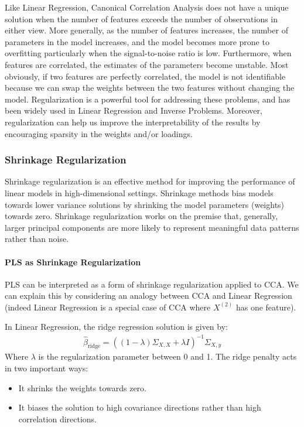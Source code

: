 Like Linear Regression, Canonical Correlation Analysis does not have a unique solution when the number of features exceeds the number of observations in either view.
More generally, as the number of features increases, the number of parameters in the model increases, and the model becomes more prone to overfitting particularly when the signal-to-noise ratio is low.
Furthermore, when features are correlated, the estimates of the parameters become unstable.
Most obviously, if two features are perfectly correlated, the model is not identifiable because we can swap the weights between the two features without changing the model.
Regularization is a powerful tool for addressing these problems, and has been widely used in Linear Regression and Inverse Problems.
Moreover, regularization can help us improve the interpretability of the results by encouraging sparsity in the weights and/or loadings.

\subsubsection{Shrinkage Regularization}

Shrinkage regularization is an effective method for improving the performance of linear models in high-dimensional settings.
Shrinkage methods bias models towards lower variance solutions by shrinking the model parameters (weights) towards zero.
Shrinkage regularization works on the premise that, generally, larger principal components are more likely to represent meaningful data patterns rather than noise.

\paragraph{PLS as Shrinkage Regularization}

PLS can be interpreted as a form of shrinkage regularization applied to CCA. We can explain this by considering an analogy between CCA and Linear Regression (indeed Linear Regression is a special case of CCA where \(X^{(2)}\) has one feature).

In Linear Regression, the ridge regression solution is given by:
\begin{align}
    \hat{\beta}_{\text{ridge}} = ((1-\lambda)\Sigma_{X,X} + \lambda I)^{-1} \Sigma_{X,y}
\end{align}
Where \(\lambda\) is the regularization parameter between 0 and 1. The ridge penalty acts in two important ways:
\begin{itemize}
    \item It shrinks the weights towards zero.
    \item It biases the solution to high covariance directions rather than high correlation directions.
\end{itemize}


